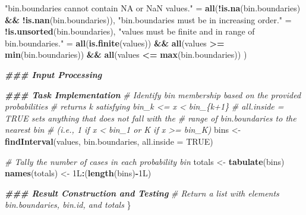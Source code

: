 \documentclass[
]{book}
\newenvironment{Shaded}{\begin{snugshade}}{\end{snugshade}}
\newcommand{\AttributeTok}[1]{\textcolor[rgb]{0.13,0.29,0.53}{#1}}
\newcommand{\CommentTok}[1]{\textcolor[rgb]{0.56,0.35,0.01}{\textit{#1}}}
\newcommand{\ConstantTok}[1]{\textcolor[rgb]{0.56,0.35,0.01}{#1}}
\newcommand{\DocumentationTok}[1]{\textcolor[rgb]{0.56,0.35,0.01}{\textbf{\textit{#1}}}}
\newcommand{\FunctionTok}[1]{\textcolor[rgb]{0.13,0.29,0.53}{\textbf{#1}}}
\newcommand{\NormalTok}[1]{#1}
\newcommand{\OtherTok}[1]{\textcolor[rgb]{0.56,0.35,0.01}{#1}}
\newcommand{\SpecialCharTok}[1]{\textcolor[rgb]{0.81,0.36,0.00}{\textbf{#1}}}
\newcommand{\StringTok}[1]{\textcolor[rgb]{0.31,0.60,0.02}{#1}}
\begin{document}
\begin{Shaded}
\begin{Highlighting}[]
    \StringTok{"\textasciigrave{}bin.boundaries\textasciigrave{} cannot contain NA or NaN values."} \OtherTok{=} 
      \FunctionTok{all}\NormalTok{(}\SpecialCharTok{!}\FunctionTok{is.na}\NormalTok{(bin.boundaries) }\SpecialCharTok{\&\&} \SpecialCharTok{!}\FunctionTok{is.nan}\NormalTok{(bin.boundaries)),}
    \StringTok{"\textasciigrave{}bin.boundaries\textasciigrave{} must be in increasing order."} \OtherTok{=} \SpecialCharTok{!}\FunctionTok{is.unsorted}\NormalTok{(bin.boundaries),}
    \StringTok{"\textasciigrave{}values\textasciigrave{} must be finite and in range of \textasciigrave{}bin.boundaries\textasciigrave{}."} \OtherTok{=} 
      \FunctionTok{all}\NormalTok{(}\FunctionTok{is.finite}\NormalTok{(values)) }\SpecialCharTok{\&\&} \FunctionTok{all}\NormalTok{(values }\SpecialCharTok{\textgreater{}=} \FunctionTok{min}\NormalTok{(bin.boundaries)) }\SpecialCharTok{\&\&} 
      \FunctionTok{all}\NormalTok{(values }\SpecialCharTok{\textless{}=} \FunctionTok{max}\NormalTok{(bin.boundaries))}
\NormalTok{  )}
  
  \DocumentationTok{\#\#\# Input Processing}
  
  \DocumentationTok{\#\#\# Task Implementation}
  \CommentTok{\# Identify bin membership based on the provided probabilities}
  \CommentTok{\# returns k satisfying bin\_k \textless{}= x \textless{} bin\_\{k+1\}}
  \CommentTok{\# all.inside = TRUE sets anything that does not fall with the}
  \CommentTok{\# range of bin.boundaries to the nearest bin }
  \CommentTok{\# (i.e., 1 if x \textless{} bin\_1 or K if x \textgreater{}= bin\_K)}
\NormalTok{  bins }\OtherTok{\textless{}{-}} \FunctionTok{findInterval}\NormalTok{(values, bin.boundaries, }\AttributeTok{all.inside =} \ConstantTok{TRUE}\NormalTok{)}
  
  \CommentTok{\# Tally the number of cases in each probability bin}
\NormalTok{  totals        }\OtherTok{\textless{}{-}} \FunctionTok{tabulate}\NormalTok{(bins)}
  \FunctionTok{names}\NormalTok{(totals) }\OtherTok{\textless{}{-}}\NormalTok{ 1L}\SpecialCharTok{:}\NormalTok{(}\FunctionTok{length}\NormalTok{(bins)}\SpecialCharTok{{-}}\NormalTok{1L)}
  
  \DocumentationTok{\#\#\# Result Construction and Testing}
  \CommentTok{\# Return a list with elements \textasciigrave{}bin.boundaries\textasciigrave{}, \textasciigrave{}bin.id\textasciigrave{}, and \textasciigrave{}totals\textasciigrave{}}
\NormalTok{\}}
\end{Highlighting}
\end{Shaded}
\end{document}
